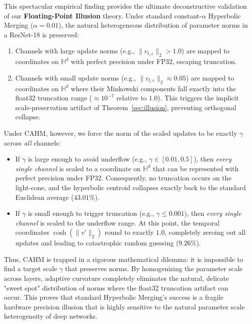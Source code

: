 \documentclass{article}
\theoremstyle{plain}
\theoremstyle{definition}
\theoremstyle{remark}
\begin{document}
This spectacular empirical finding provides the ultimate deconstructive validation of our \textbf{Floating-Point Illusion} theory. Under standard constant-$\alpha$ Hyperbolic Merging ($\alpha = 0.01$), the natural heterogeneous distribution of parameter norms in a ResNet-18 is preserved:
\begin{enumerate}
    \item Channels with large update norms (e.g., $\|v_{t, c}\|_2 > 1.0$) are mapped to coordinates on $\mathbb{H}^d$ with perfect precision under FP32, escaping truncation.
    \item Channels with small update norms (e.g., $\|v_{t, c}\|_2 \approx 0.05$) are mapped to coordinates on $\mathbb{H}^d$ where their Minkowski components fall exactly into the float32 truncation range ($\approx 10^{-7}$ relative to $1.0$). This triggers the implicit scale-preservation artifact of Theorem~\ref{sec:illusion}, preventing orthogonal collapse.
\end{enumerate}
Under CAHM, however, we force the norm of the scaled updates to be exactly $\gamma$ across \textit{all} channels:
\begin{itemize}
    \item If $\gamma$ is large enough to avoid underflow (e.g., $\gamma \in [0.01, 0.5]$), then \textit{every single channel} is scaled to a coordinate on $\mathbb{H}^d$ that can be represented with perfect precision under FP32. Consequently, no truncation occurs on the light-cone, and the hyperbolic centroid collapses exactly back to the standard Euclidean average ($43.01\%$).
    \item If $\gamma$ is small enough to trigger truncation (e.g., $\gamma \le 0.001$), then \textit{every single channel} is scaled to the underflow range. At this point, the temporal coordinates $\cosh(\|v'\|_2)$ round to exactly $1.0$, completely zeroing out all updates and leading to catastrophic random guessing ($9.26\%$).
\end{itemize}

Thus, CAHM is trapped in a rigorous mathematical dilemma: it is impossible to find a target scale $\gamma$ that preserves norms. By homogenizing the parameter scale across layers, adaptive curvature completely eliminates the natural, delicate "sweet spot" distribution of norms where the float32 truncation artifact can occur. This proves that standard Hyperbolic Merging's success is a fragile hardware precision illusion that is highly sensitive to the natural parameter scale heterogeneity of deep networks.
\end{document}
